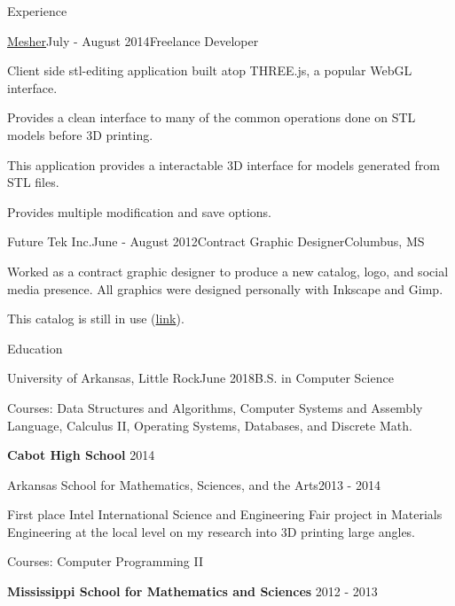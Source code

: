 \documentclass{resume} %
\begin{document}
\begin{rSection}{Experience}
\begin{rSubsection}{\href{http://github.com/cptaffe/Mesher}{Mesher}}{July - August 2014}{Freelance Developer}{}

	\item Client side stl-editing application built atop THREE.js, a popular WebGL interface.
	\item Provides a clean interface to many of the common operations done on STL models before 3D printing.
	\item This application provides a interactable 3D interface for models generated from STL files.
	\item Provides multiple modification and save options.
\end{rSubsection}

\begin{rSubsection}{Future Tek Inc.}{June - August 2012}{Contract Graphic Designer}{Columbus, MS}

	\item Worked as a contract graphic designer to produce a new catalog, logo, and social media presence. All graphics were designed personally with Inkscape and Gimp.
	\item This catalog is still in use (\href{http://www.futuretekinc.com/wp-content/uploads/2014/08/Future-Tek-Catalog.pdf}{link}).
\end{rSubsection}

\end{rSection}

\clearpage


\begin{rSection}{Education}

\begin{rSubsection}{University of Arkansas, Little Rock}{June 2018}{B.S. in Computer Science}

	\item Courses: Data Structures and Algorithms, Computer Systems and Assembly Language, Calculus II, Operating Systems, Databases, and Discrete Math.
\end{rSubsection}

{\bf Cabot High School} \hfill {2014} \hspace{0.0em}

\begin{rSubsection}{Arkansas School for Mathematics, Sciences, and the Arts}{2013 - 2014}{}

	\item First place Intel International Science and Engineering Fair project in Materials Engineering at the local level on my research into 3D printing large angles.
	\item Courses: Computer Programming II
\end{rSubsection}


{\bf Mississippi School for Mathematics and Sciences} \hfill {2012 - 2013} \hspace{0.0em}

\end{rSection}
\end{document}
